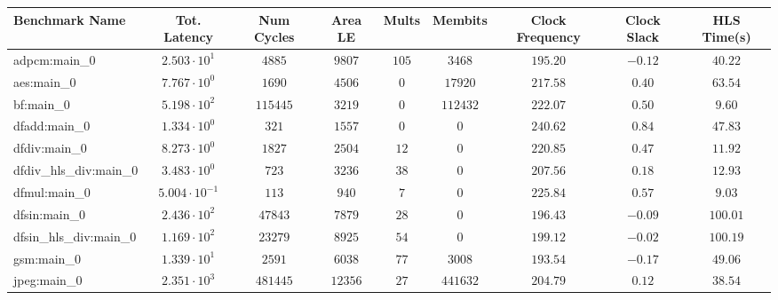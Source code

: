 \begin{tabular}{|l|c|c|c|c|c|c|c|c|}
\hline
Benchmark Name          & Tot. Latency            & Num Cycles & Area LE   & Mults   & Membits    & Clock Frequency & Clock Slack & HLS Time(s) \\
\hline
adpcm:main\_0           & $ 2.503 \cdot 10^{1}  $ & $ 4885   $ & $ 9807  $ & $ 105 $ & $ 3468   $ & $ 195.20      $ & $ -0.12   $ & $ 40.22   $ \\
aes:main\_0             & $ 7.767 \cdot 10^{0}  $ & $ 1690   $ & $ 4506  $ & $ 0   $ & $ 17920  $ & $ 217.58      $ & $ 0.40    $ & $ 63.54   $ \\
bf:main\_0              & $ 5.198 \cdot 10^{2}  $ & $ 115445 $ & $ 3219  $ & $ 0   $ & $ 112432 $ & $ 222.07      $ & $ 0.50    $ & $ 9.60    $ \\
dfadd:main\_0           & $ 1.334 \cdot 10^{0}  $ & $ 321    $ & $ 1557  $ & $ 0   $ & $ 0      $ & $ 240.62      $ & $ 0.84    $ & $ 47.83   $ \\
dfdiv:main\_0           & $ 8.273 \cdot 10^{0}  $ & $ 1827   $ & $ 2504  $ & $ 12  $ & $ 0      $ & $ 220.85      $ & $ 0.47    $ & $ 11.92   $ \\
dfdiv\_hls\_div:main\_0 & $ 3.483 \cdot 10^{0}  $ & $ 723    $ & $ 3236  $ & $ 38  $ & $ 0      $ & $ 207.56      $ & $ 0.18    $ & $ 12.93   $ \\
dfmul:main\_0           & $ 5.004 \cdot 10^{-1} $ & $ 113    $ & $ 940   $ & $ 7   $ & $ 0      $ & $ 225.84      $ & $ 0.57    $ & $ 9.03    $ \\
dfsin:main\_0           & $ 2.436 \cdot 10^{2}  $ & $ 47843  $ & $ 7879  $ & $ 28  $ & $ 0      $ & $ 196.43      $ & $ -0.09   $ & $ 100.01  $ \\
dfsin\_hls\_div:main\_0 & $ 1.169 \cdot 10^{2}  $ & $ 23279  $ & $ 8925  $ & $ 54  $ & $ 0      $ & $ 199.12      $ & $ -0.02   $ & $ 100.19  $ \\
gsm:main\_0             & $ 1.339 \cdot 10^{1}  $ & $ 2591   $ & $ 6038  $ & $ 77  $ & $ 3008   $ & $ 193.54      $ & $ -0.17   $ & $ 49.06   $ \\
jpeg:main\_0            & $ 2.351 \cdot 10^{3}  $ & $ 481445 $ & $ 12356 $ & $ 27  $ & $ 441632 $ & $ 204.79      $ & $ 0.12    $ & $ 38.54   $ \\

\end{tabular}
